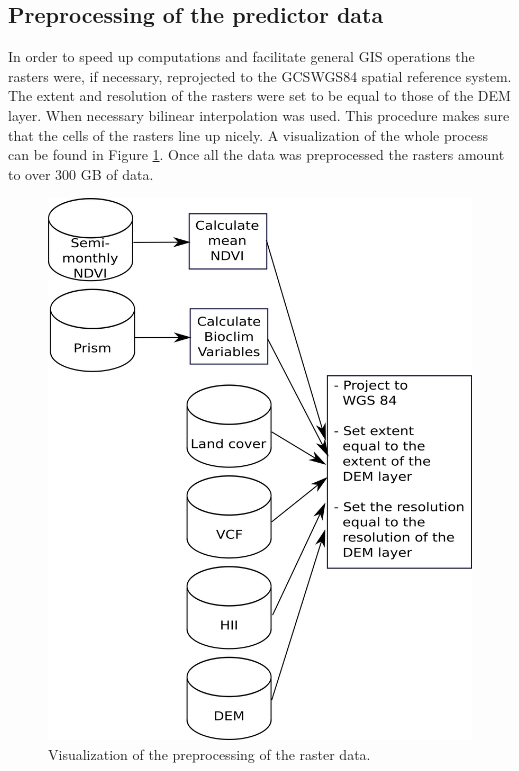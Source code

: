 \subsection{Preprocessing of the predictor data}
\label{sec:preprocessing}
In order to speed up computations and facilitate general GIS operations the rasters were, if necessary, reprojected to the GCS\textunderscore WGS84 spatial reference system. The extent and resolution of the rasters were set to be equal to those of the DEM layer. When necessary bilinear interpolation was used. This procedure makes sure that the cells of the rasters line up nicely. A visualization of the whole process can be found in Figure \ref{fig:DataCommonlyUsedInSpeciesDistributionModels:DataScheme}. Once all the data was preprocessed the rasters amount to over $300$ GB of data.

\begin{figure}[!htb]
\centering
\includegraphics[scale=0.35]{VectorGraphics/DataScheme.png}
\caption{\label{fig:DataCommonlyUsedInSpeciesDistributionModels:DataScheme}Visualization of the preprocessing of the raster data.}
\end{figure}


